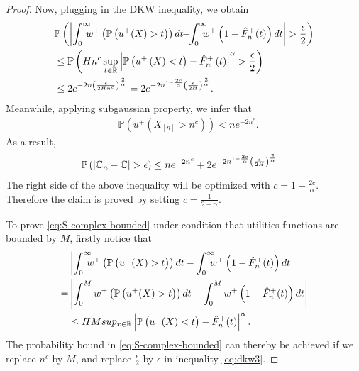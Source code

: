 \begin{proof}
Now, plugging in the DKW inequality, we obtain
\begin{align}
&\mathbb{P}\left(\left|\intinfinity\!\!\!\! w^+\left(\Prob{u^+(X)>t}\right) dt \!\!-\!\! \intinfinity\!\!\!\! w^+\left(1- {\hat F^+_n}(t)\right) dt\right|>\frac{\epsilon}{2}\right)
\nonumber\\
& \leq \mathbb{P}\left(Hn^c\sup_{t\in \mathbb{R}} \left|\Prob{u^+\left(X\right)<t}-{\hat F^+_n}\left(t\right)\right|^\alpha > \frac{\epsilon}{2}\right)
\nonumber\\
&
\leq  2 e^{-2n \left(\frac{\epsilon}{2Hn^c} \right)^\frac{2}{\alpha}} = 
2 e^{-2n^{1-\frac{2c}{\alpha}}\left(\frac{\epsilon}{2H}\right)^{\frac{2}{\alpha}}} .\label{eq:dkw3}
\end{align}
Meanwhile, applying subgaussian property, we infer that
\begin{align*}
&
\mathbb{P}\left(u^+ \left(X_{[n]} > n^c \right)\right) < n e ^{-2n^c}.
\end{align*}
As a result, 
\begin{align*}
& \mathbb{P}\left(\left|\mathbb{C}_n -\mathbb{C} \right| > \epsilon \right) 
\leq n e ^{-2n^c} + 2 e^{-2n^{1-\frac{2c}{\alpha}}\left(\frac{\epsilon}{2H}\right)^{\frac{2}{\alpha}}}
\end{align*}
The right side of the above inequality will be optimized with $c = 1 - \frac{2c}{\alpha}$. Therefore the claim is proved by setting
$c = \frac{1}{2+\alpha}$.

To prove \eqref{eq:S-complex-bounded} under condition that utilities functions are bounded by $M$, firstly notice that
\begin{align*}
&\left|\int_0^{\infty}\!\!\!\! w^+\left(\Prob{u^+(X)>t}\right) dt- \int_0^{\infty} \!\!\!\! w^+\left(1- {\hat F^+_n}(t)\right) dt\right| \\ = &
    \left|\int_0^{M} w^+\left(\Prob{u^+(X)>t}\right) dt- \int_0^{M} w^+\left(1- {\hat F^+_n}(t)\right) dt\right| \\
    &\leq  HM sup_{x\in\mathbb{R}}\left|\Prob{u^+(X)<t}-{\hat F^+_n}(t)\right|^\alpha.
\end{align*}
The probability bound in \eqref{eq:S-complex-bounded} can thereby be achieved if we replace $n^c$ by $M$, and replace $\frac{\epsilon}{2}$ by $\epsilon$ in inequality \eqref{eq:dkw3}.
\end{proof}

